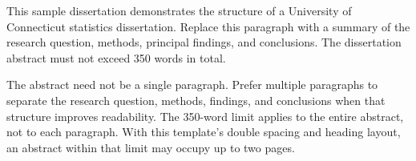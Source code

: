 This sample dissertation demonstrates the structure of a University of
Connecticut statistics dissertation. Replace this paragraph with a summary
of the research question, methods, principal findings, and conclusions.
The dissertation abstract must not exceed 350 words in total.


The abstract need not be a single paragraph. Prefer multiple paragraphs to
separate the research question, methods, findings, and conclusions when that
structure improves readability. The 350-word limit applies to the entire
abstract, not to each paragraph. With this template's double spacing and
heading layout, an abstract within that limit may occupy up to two pages.

